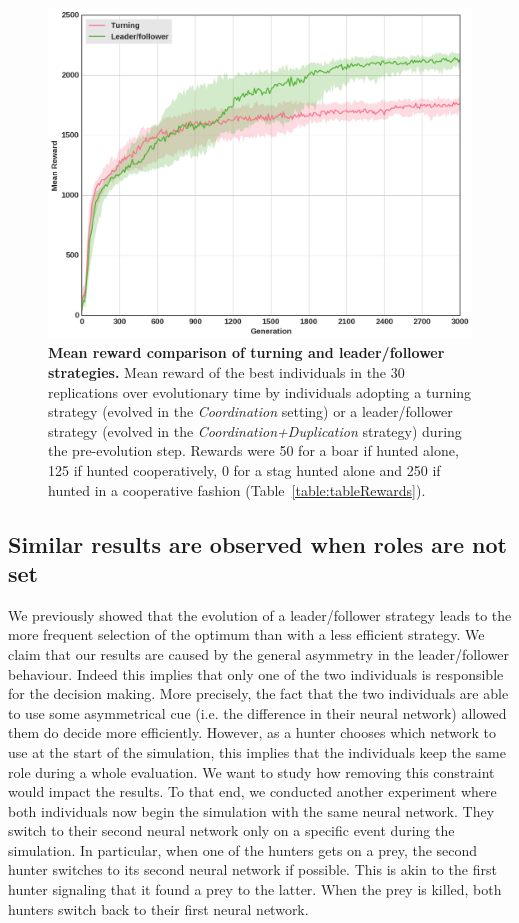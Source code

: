     \begin{figure}[h]
      \centering
        \includegraphics[width=0.7\linewidth]{fig/ArticleBio2/Fig6.png}
        \caption{\textbf{Mean reward comparison of turning and leader/follower strategies.}
        Mean reward of the best individuals in the $30$ replications over evolutionary time by individuals adopting a turning strategy (evolved in the \emph{Coordination} setting) or a leader/follower strategy (evolved in the \emph{Coordination+Duplication} strategy) during the pre-evolution step. Rewards were 50 for a boar if hunted alone, 125 if hunted cooperatively, 0 for a stag hunted alone and 250 if hunted in a cooperative fashion (Table~\ref{table:tableRewards}).}
      \label{fig:fitnessRecyclingLeadership}
    \end{figure}


  \subsection{Similar results are observed when roles are not set}
    We previously showed that the evolution of a leader/follower strategy leads to the more frequent selection of the optimum than with a less efficient strategy. We claim that our results are caused by the general asymmetry in the leader/follower behaviour. Indeed this implies that only one of the two individuals is responsible for the decision making. More precisely, the fact that the two individuals are able to use some asymmetrical cue (i.e. the difference in their neural network) allowed them do decide more efficiently. However, as a hunter chooses which network to use at the start of the simulation, this implies that the individuals keep the same role during a whole evaluation.  We want to study how removing this constraint would impact the results. To that end, we conducted another experiment where both individuals now begin the simulation with the same neural network. They switch to their second neural network only on a specific event during the simulation. In particular, when one of the hunters gets on a prey, the second hunter switches to its second neural network if possible. This is akin to the first hunter signaling that it found a prey to the latter. When the prey is killed, both hunters switch back to their first neural network.

